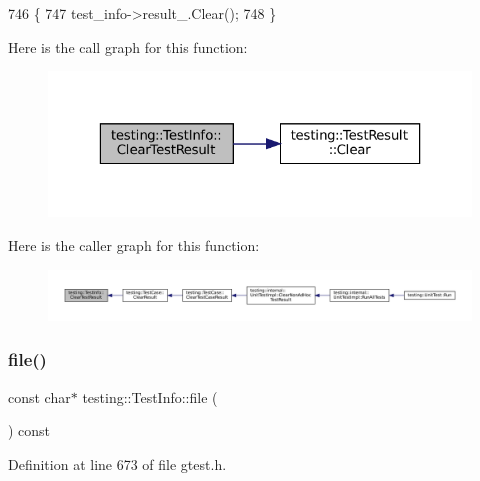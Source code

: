 \begin{DoxyCode}
746                                                    \{
747     test\_info->result\_.Clear();
748   \}
\end{DoxyCode}
Here is the call graph for this function\+:
\nopagebreak
\begin{figure}[H]
\begin{center}
\leavevmode
\includegraphics[width=323pt]{classtesting_1_1TestInfo_ac6d80865a3e68478aaf167058e6ca5c2_cgraph}
\end{center}
\end{figure}
Here is the caller graph for this function\+:
\nopagebreak
\begin{figure}[H]
\begin{center}
\leavevmode
\includegraphics[width=350pt]{classtesting_1_1TestInfo_ac6d80865a3e68478aaf167058e6ca5c2_icgraph}
\end{center}
\end{figure}
\mbox{\label{classtesting_1_1TestInfo_a9b74d79cf618ce5bb0d0b1da75ee8b35}} 
\subsubsection{\texorpdfstring{file()}{file()}}
{\footnotesize\ttfamily const char$\ast$ testing\+::\+Test\+Info\+::file (\begin{DoxyParamCaption}{ }\end{DoxyParamCaption}) const\hspace{0.3cm}{\ttfamily [inline]}}



Definition at line 673 of file gtest.\+h.


